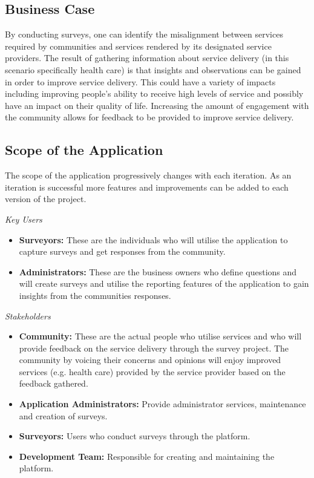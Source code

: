 \documentclass[12pt]{witseiepaper}
\begin{document}
\subsection{Business Case} 
  
\noindent By conducting surveys, one can identify the misalignment between services required by communities and services rendered by its designated service providers. The result of gathering information about service delivery (in this scenario specifically health care) is that insights and observations can be gained in order to improve service delivery. This could have a variety of impacts including improving people's ability to receive high levels of service and possibly have an impact on their quality of life. Increasing the amount of engagement with the community allows for feedback to be provided to improve service delivery.

\subsection{Scope of the Application}
The scope of the application progressively changes with each iteration. As an iteration is successful more features and improvements can be added to each version of the project.

\emph{Key Users} 
\begin{itemize}
  \item \textbf{Surveyors:} These are the individuals who will utilise the application to capture surveys and get responses from the community.
  \item \textbf{Administrators:} These are the business owners who define questions and will create surveys and utilise the reporting features of the application to gain insights from the communities responses.
\end{itemize}

\emph{Stakeholders} 
\begin{itemize}
  \item \textbf{Community:} These are the actual people who utilise services and who will provide feedback on the service delivery through the survey project. The community by voicing their concerns and opinions will enjoy improved services (e.g. health care) provided by the service provider based on the feedback gathered.
  \item \textbf{Application Administrators:} Provide administrator services, maintenance and creation of surveys.
  \item \textbf{Surveyors:} Users who conduct surveys through the platform.
  \item \textbf{Development Team:} Responsible for creating and maintaining the platform. 
\end{itemize}
\end{document}
